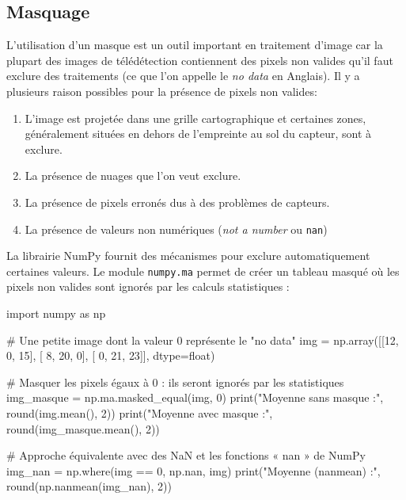 \documentclass[
  french,
  11pt,
  letterpaper,
  open=any,
  twoside=false,
  french]{scrbook}
\newenvironment{Shaded}{\begin{snugshade}}{\end{snugshade}}
\newcommand{\BuiltInTok}[1]{\textcolor[rgb]{0.00,0.23,0.31}{#1}}
\newcommand{\CommentTok}[1]{\textcolor[rgb]{0.37,0.37,0.37}{#1}}
\newcommand{\DecValTok}[1]{\textcolor[rgb]{0.68,0.00,0.00}{#1}}
\newcommand{\ImportTok}[1]{\textcolor[rgb]{0.00,0.46,0.62}{#1}}
\newcommand{\NormalTok}[1]{\textcolor[rgb]{0.00,0.23,0.31}{#1}}
\newcommand{\OperatorTok}[1]{\textcolor[rgb]{0.37,0.37,0.37}{#1}}
\newcommand{\StringTok}[1]{\textcolor[rgb]{0.13,0.47,0.30}{#1}}
\begin{document}
\subsection{Masquage}\label{masquage}

L'utilisation d'un masque est un outil important en traitement d'image
car la plupart des images de télédétection contiennent des pixels non
valides qu'il faut exclure des traitements (ce que l'on appelle le
\emph{no data} en Anglais). Il y a plusieurs raison possibles pour la
présence de pixels non valides:

\begin{enumerate}
\def\labelenumi{\arabic{enumi}.}
\item
  L'image est projetée dans une grille cartographique et certaines
  zones, généralement situées en dehors de l'empreinte au sol du
  capteur, sont à exclure.
\item
  La présence de nuages que l'on veut exclure.
\item
  La présence de pixels erronés dus à des problèmes de capteurs.
\item
  La présence de valeurs non numériques (\emph{not a number} ou
  \texttt{nan})
\end{enumerate}

La librairie NumPy fournit des mécanismes pour exclure automatiquement
certaines valeurs. Le module \texttt{numpy.ma} permet de créer un
tableau masqué où les pixels non valides sont ignorés par les calculs
statistiques :

\begin{Shaded}
\begin{Highlighting}[]
\ImportTok{import}\NormalTok{ numpy }\ImportTok{as}\NormalTok{ np}

\CommentTok{\# Une petite image dont la valeur 0 représente le "no data"}
\NormalTok{img }\OperatorTok{=}\NormalTok{ np.array([[}\DecValTok{12}\NormalTok{,  }\DecValTok{0}\NormalTok{, }\DecValTok{15}\NormalTok{],}
\NormalTok{                [ }\DecValTok{8}\NormalTok{, }\DecValTok{20}\NormalTok{,  }\DecValTok{0}\NormalTok{],}
\NormalTok{                [ }\DecValTok{0}\NormalTok{, }\DecValTok{21}\NormalTok{, }\DecValTok{23}\NormalTok{]], dtype}\OperatorTok{=}\BuiltInTok{float}\NormalTok{)}

\CommentTok{\# Masquer les pixels égaux à 0 : ils seront ignorés par les statistiques}
\NormalTok{img\_masque }\OperatorTok{=}\NormalTok{ np.ma.masked\_equal(img, }\DecValTok{0}\NormalTok{)}
\BuiltInTok{print}\NormalTok{(}\StringTok{"Moyenne sans masque :"}\NormalTok{, }\BuiltInTok{round}\NormalTok{(img.mean(), }\DecValTok{2}\NormalTok{))}
\BuiltInTok{print}\NormalTok{(}\StringTok{"Moyenne avec masque :"}\NormalTok{, }\BuiltInTok{round}\NormalTok{(img\_masque.mean(), }\DecValTok{2}\NormalTok{))}

\CommentTok{\# Approche équivalente avec des NaN et les fonctions « nan » de NumPy}
\NormalTok{img\_nan }\OperatorTok{=}\NormalTok{ np.where(img }\OperatorTok{==} \DecValTok{0}\NormalTok{, np.nan, img)}
\BuiltInTok{print}\NormalTok{(}\StringTok{"Moyenne (nanmean)   :"}\NormalTok{, }\BuiltInTok{round}\NormalTok{(np.nanmean(img\_nan), }\DecValTok{2}\NormalTok{))}
\end{Highlighting}
\end{Shaded}
\end{document}
